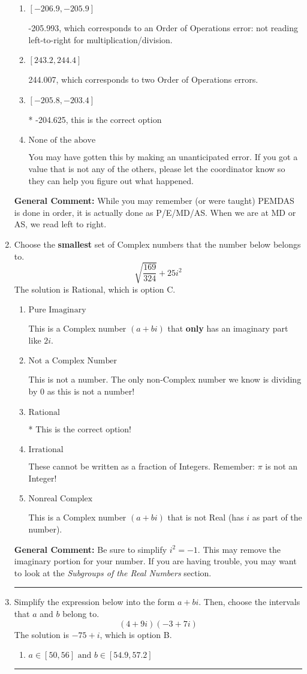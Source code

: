 \documentclass{extbook}[14pt]
\newcommand{\litem}[1]{\item #1

\rule{\textwidth}{0.4pt}}
\begin{document}
\begin{enumerate}
{\begin{enumerate}[label=\Alph*.]
 245.375, which corresponds to an Order of Operations error: multiplying by negative before squaring. For example: $(-3)^2 \neq -3^2$
\item \( [-206.9, -205.9] \)

 -205.993, which corresponds to an Order of Operations error: not reading left-to-right for multiplication/division.
\item \( [243.2, 244.4] \)

 244.007, which corresponds to two Order of Operations errors.
\item \( [-205.8, -203.4] \)

* -204.625, this is the correct option
\item \( \text{None of the above} \)

 You may have gotten this by making an unanticipated error. If you got a value that is not any of the others, please let the coordinator know so they can help you figure out what happened.
\end{enumerate}

\textbf{General Comment:} While you may remember (or were taught) PEMDAS is done in order, it is actually done as P/E/MD/AS. When we are at MD or AS, we read left to right.
}
\litem{
Choose the \textbf{smallest} set of Complex numbers that the number below belongs to.
\[ \sqrt{\frac{169}{324}} + 25i^2 \]The solution is \( \text{Rational} \), which is option C.\begin{enumerate}[label=\Alph*.]
\item \( \text{Pure Imaginary} \)

This is a Complex number $(a+bi)$ that \textbf{only} has an imaginary part like $2i$.
\item \( \text{Not a Complex Number} \)

This is not a number. The only non-Complex number we know is dividing by 0 as this is not a number!
\item \( \text{Rational} \)

* This is the correct option!
\item \( \text{Irrational} \)

These cannot be written as a fraction of Integers. Remember: $\pi$ is not an Integer!
\item \( \text{Nonreal Complex} \)

This is a Complex number $(a+bi)$ that is not Real (has $i$ as part of the number).
\end{enumerate}

\textbf{General Comment:} Be sure to simplify $i^2 = -1$. This may remove the imaginary portion for your number. If you are having trouble, you may want to look at the \textit{Subgroups of the Real Numbers} section.
}
\litem{
Simplify the expression below into the form $a+bi$. Then, choose the intervals that $a$ and $b$ belong to.
\[ (4 + 9 i)(-3 + 7 i) \]The solution is \( -75 + i \), which is option B.\begin{enumerate}[label=\Alph*.]
\item \( a \in [50, 56] \text{ and } b \in [54.9, 57.2] \)


\end{enumerate}}
\end{enumerate}
\end{document}

